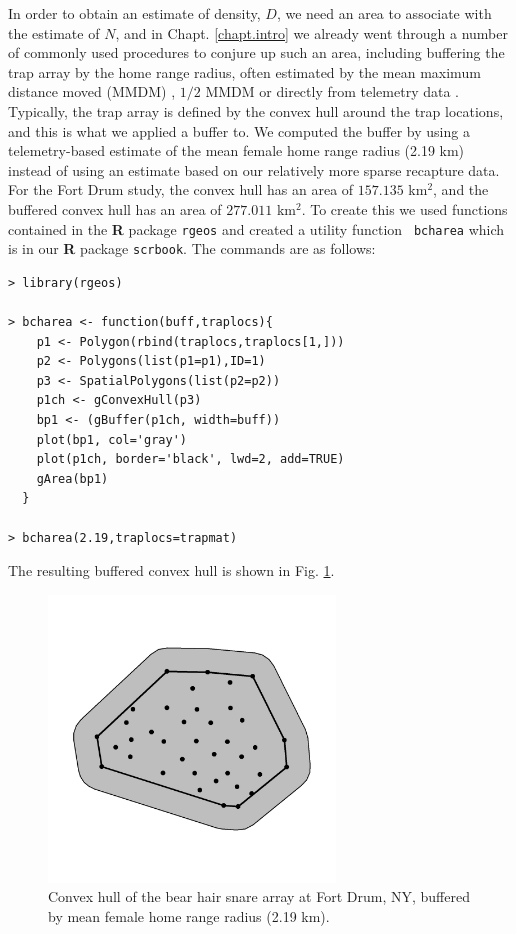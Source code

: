 In order to obtain an estimate of density, $D$, we need an area to
associate with the estimate of $N$, and in Chapt.  \ref{chapt.intro}
we already went through a number of commonly used procedures to
conjure up such an area, including buffering the trap array by the
home range radius, often estimated by the mean maximum distance moved
(MMDM) \citep{parmenter_etal:2003}, $1/2$ MMDM \citep{dice:1938} or
directly from telemetry data \citep{wallace_etal:2003}.
Typically, the trap array is defined by the convex hull around the
trap locations, and this is what we applied a buffer to. We computed
the buffer by using a telemetry-based estimate of the mean female home range radius
(2.19 km)  \citep{bales_etal:2005}
instead of using an estimate based on our relatively more sparse
recapture data.  For the Fort Drum study, the convex hull has an area
of $157.135$ km$^2$, and the buffered convex hull has an area of $277.011$
km$^2$.  To create this we used functions contained in the {\bf R}
package \mbox{\tt rgeos} and created a utility function \mbox{\tt
  bcharea} which is in our {\bf R} package \mbox{\tt scrbook}. The
commands are as follows:
\begin{verbatim}
> library(rgeos)

> bcharea <- function(buff,traplocs){
    p1 <- Polygon(rbind(traplocs,traplocs[1,]))
    p2 <- Polygons(list(p1=p1),ID=1)
    p3 <- SpatialPolygons(list(p2=p2))
    p1ch <- gConvexHull(p3)
    bp1 <- (gBuffer(p1ch, width=buff))
    plot(bp1, col='gray')
    plot(p1ch, border='black', lwd=2, add=TRUE)
    gArea(bp1)
  }

> bcharea(2.19,traplocs=trapmat)
\end{verbatim}
The resulting buffered convex hull is shown in Fig. \ref{closed.fig.bch}.
\begin{figure}[ht]
\begin{center}
\includegraphics[height=3in,width=3in]{Ch4-Closed/figs/bufferedCH}
\end{center}
\caption{Convex hull of the bear hair snare array at Fort Drum, NY, buffered by mean female
home range radius (2.19 km).}
\label{closed.fig.bch}
\end{figure}

